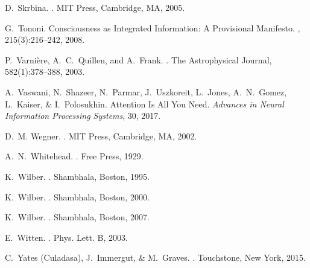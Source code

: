 \documentclass[12pt,a4paper]{article}
\begin{document}
\begin{thebibliography}{99}
D.~Skrbina.
.
\newblock MIT Press, Cambridge, MA, 2005.

G.~Tononi.
\newblock Consciousness as Integrated Information: A Provisional Manifesto.
, 215(3):216--242, 2008.

P.~Varnière, A.~C.~Quillen, and A.~Frank.
.
\newblock The Astrophysical Journal, 582(1):378--388, 2003.

A.~Vaswani, N.~Shazeer, N.~Parmar, J.~Uszkoreit, L.~Jones, A.~N.~Gomez, L.~Kaiser, \& I.~Polosukhin.
\newblock Attention Is All You Need.
\newblock \emph{Advances in Neural Information Processing Systems}, 30, 2017.

D.~M. Wegner.
.
\newblock MIT Press, Cambridge, MA, 2002.

A.~N.~Whitehead.
.
\newblock Free Press, 1929.

K.~Wilber.
.
\newblock Shambhala, Boston, 1995.

K.~Wilber.
.
\newblock Shambhala, Boston, 2000.

K.~Wilber.
.
\newblock Shambhala, Boston, 2007.

E.~Witten.
.
\newblock Phys. Lett. B, 2003.

C.~Yates (Culadasa), J.~Immergut, \& M.~Graves.
.
\newblock Touchstone, New York, 2015.


\end{thebibliography}
\end{document}

